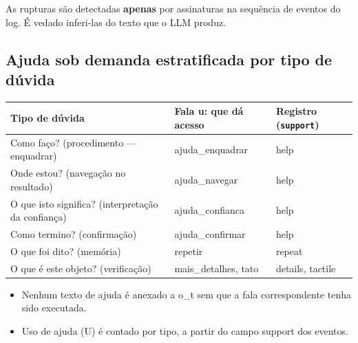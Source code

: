 \documentclass[a4paper,10pt]{article}
\begin{document}
\noindent As rupturas são detectadas \textbf{apenas} por assinaturas na sequência de eventos do log. É vedado inferi-las do texto que o LLM produz.

\subsection*{Ajuda sob demanda estratificada por tipo de dúvida}
\begin{tabularx}{\linewidth}{X L{6cm} L{5cm}}
\toprule
Tipo de dúvida & Fala u: que dá acesso & Registro (\texttt{support})\\
\midrule
Como faço? (procedimento — enquadrar) & ajuda\_enquadrar & help\\
Onde estou? (navegação no resultado) & ajuda\_navegar & help\\
O que isto significa? (interpretação da confiança) & ajuda\_confianca & help\\
Como termino? (confirmação) & ajuda\_confirmar & help\\
O que foi dito? (memória) & repetir & repeat\\
O que é este objeto? (verificação) & mais\_detalhes, tato & details, tactile\\
\bottomrule
\end{tabularx}
\begin{itemize}\setlength\itemsep{0pt}
\item Nenhum texto de ajuda é anexado a o\_t sem que a fala correspondente tenha sido executada.
\item Uso de ajuda (U) é contado por tipo, a partir do campo support dos eventos.
\end{itemize}
\end{document}
